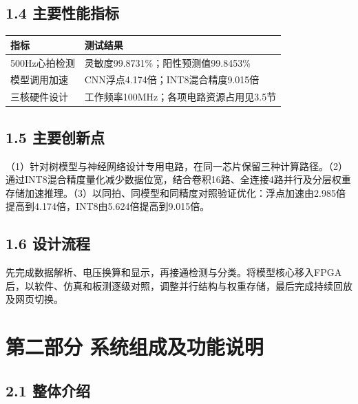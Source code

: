 \documentclass[UTF8,12pt,a4paper,fontset=none]{ctexart}
\begin{document}
\subsection{1.4 主要性能指标}

{%
\begin{longtable}[]{@{}
  >{\raggedright\arraybackslash}p{}
  >{\raggedright\arraybackslash}p{}@{}}
\toprule\noalign{}
\begin{minipage}[b]{\linewidth}\raggedright
\textbf{指标}
\end{minipage} & \begin{minipage}[b]{\linewidth}\raggedright
\textbf{测试结果}
\end{minipage} \\
\midrule\noalign{}
\endhead
\bottomrule\noalign{}
\endlastfoot
500Hz心拍检测 & 灵敏度99.8731\%；阳性预测值99.8453\% \\
模型调用加速 & CNN浮点4.174倍；INT8混合精度9.015倍 \\
三核硬件设计 & 工作频率100MHz；各项电路资源占用见3.5节 \\
\end{longtable}
}

\subsection{1.5 主要创新点}

（1）针对树模型与神经网络设计专用电路，在同一芯片保留三种计算路径。（2）通过INT8混合精度量化减少数据位宽，结合卷积16路、全连接4路并行及分层权重存储加速推理。（3）以同拍、同模型和同精度对照验证优化：浮点加速由2.985倍提高到4.174倍，INT8由5.624倍提高到9.015倍。

\subsection{1.6 设计流程}

先完成数据解析、电压换算和显示，再接通检测与分类。将模型核心移入FPGA后，以软件、仿真和板测逐级对照，调整并行结构与权重存储，最后完成持续回放及网页切换。

\section{第二部分 系统组成及功能说明}

\subsection{2.1 整体介绍}
\end{document}
